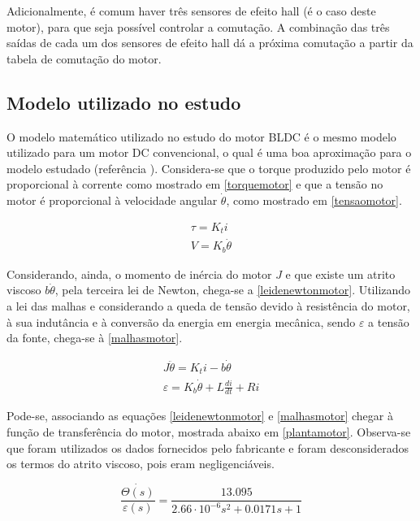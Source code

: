 \documentclass[a4paper,11pt]{article}
\begin{document}
		
		Adicionalmente, é comum haver três sensores de efeito hall (é o caso deste motor), para que seja possível controlar a comutação. A combinação das três saídas de cada um dos sensores de efeito hall dá a próxima comutação a partir da tabela de comutação do motor.
		
		\subsection{Modelo utilizado no estudo}
		
		O modelo matemático utilizado no estudo do motor BLDC é o mesmo modelo utilizado para um motor DC convencional, o qual é uma boa aproximação para o modelo estudado (referência \cite{modelomotor}). Considera-se que o torque produzido pelo motor é proporcional à corrente como mostrado em \ref{torquemotor} e que a tensão no motor é proporcional à velocidade angular $\dot{\theta}$, como mostrado em \ref{tensaomotor}.
		
		\begin{align}
			\tau = K_ti \label{torquemotor}\\
			V = K_b\dot{\theta} \label{tensaomotor}
		\end{align}
		
		Considerando, ainda, o momento de inércia do motor $J$ e que existe um atrito viscoso $b\dot{\theta}$, pela terceira lei de Newton, chega-se a \ref{leidenewtonmotor}. Utilizando a lei das malhas e considerando a queda de tensão devido à resistência do motor, à sua indutância e à conversão da energia em energia mecânica, sendo $\varepsilon$ a tensão da fonte, chega-se à \ref{malhasmotor}.
		
		\begin{align}
			J\ddot{\theta} = K_ti - b\dot{\theta} \label{leidenewtonmotor}\\
			\varepsilon = K_b\dot{\theta} + L\frac{di}{dt} + Ri \label{malhasmotor}
		\end{align}
		
		Pode-se, associando as equações \ref{leidenewtonmotor} e \ref{malhasmotor} chegar à função de transferência do motor, mostrada abaixo em \ref{plantamotor}. Observa-se que foram utilizados os dados fornecidos pelo fabricante e foram desconsiderados os termos do atrito viscoso, pois eram negligenciáveis.
		
		\begin{equation}
			\frac{\dot{\Theta(s)}}{\varepsilon(s)} = \frac{13.095}{2.66 \cdot 10^{-6} s^2+0.0171s+1} \label{plantamotor}
		\end{equation}
		
\end{document}
